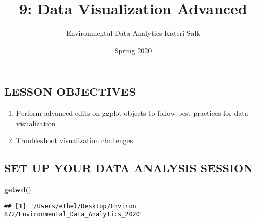 \documentclass[]{article}
\title{9: Data Visualization Advanced}
\author{Environmental Data Analytics \textbar{} Kateri Salk}
\date{Spring 2020}
\newenvironment{Shaded}{\begin{snugshade}}{\end{snugshade}}
\newcommand{\KeywordTok}[1]{\textcolor[rgb]{0.13,0.29,0.53}{\textbf{#1}}}
\newcommand{\NormalTok}[1]{#1}
\providecommand{\tightlist}{%
  \setlength{\itemsep}{0pt}\setlength{\parskip}{0pt}}
\begin{document}
\maketitle

\hypertarget{lesson-objectives}{%
\subsection{LESSON OBJECTIVES}\label{lesson-objectives}}

\begin{enumerate}
\def\labelenumi{\arabic{enumi}.}
\tightlist
\item
  Perform advanced edits on ggplot objects to follow best practices for
  data visualization
\item
  Troubleshoot visualization challenges
\end{enumerate}

\hypertarget{set-up-your-data-analysis-session}{%
\subsection{SET UP YOUR DATA ANALYSIS
SESSION}\label{set-up-your-data-analysis-session}}

\begin{Shaded}
\begin{Highlighting}[]
\KeywordTok{getwd}\NormalTok{()}
\end{Highlighting}
\end{Shaded}

\begin{verbatim}
## [1] "/Users/ethel/Desktop/Environ 872/Environmental_Data_Analytics_2020"
\end{verbatim}
\end{document}
